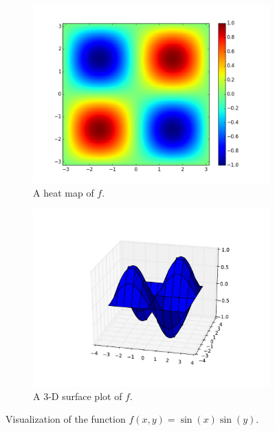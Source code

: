 \begin{figure}[H] %
\captionsetup[subfigure]{justification=centering}
\centering
\begin{subfigure}{.5\textwidth}
    \centering
    \includegraphics[width=\linewidth]{sinxsiny.png}
    \caption{A heat map of $f$.}
    \label{fig:heatmap}
\end{subfigure}%
\begin{subfigure}{.5\textwidth}
    \centering
    \includegraphics[width=\linewidth]{sinxsiny_3d.pdf}
    \caption{A 3-D surface plot of $f$.}
    \label{fig:surface}
\end{subfigure}
\caption{Visualization of the function $f(x,y) = \sin(x)\sin(y)$.}
\end{figure}

